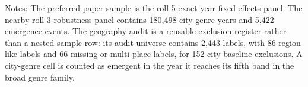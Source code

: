 \begin{table}[p]
\vspace{0.4em}
\parbox{0.96\textwidth}{\footnotesize Notes: The preferred paper sample is the roll-5 exact-year
fixed-effects panel. The nearby roll-3 robustness panel contains 180,498
city-genre-years and 5,422 emergence events. The geography audit is a reusable exclusion register
rather than a nested sample row: its audit universe contains 2,443 labels, with 86
region-like labels and 66 missing-or-multi-place labels, for 152
city-baseline exclusions. A city-genre cell is counted as emergent in the year it reaches its
fifth band in the broad genre family.}
\end{table}
